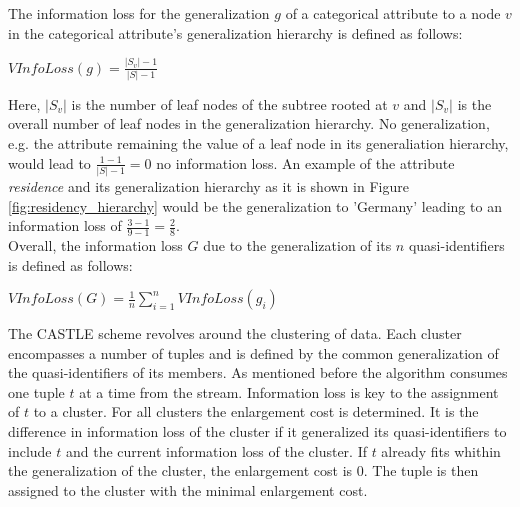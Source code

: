 The information loss for the generalization $g$ of a categorical attribute to a node $v$ in the categorical attribute's generalization hierarchy is defined as follows: 

\begin{center}
    $VInfoLoss(g) = \frac{|S_v| - 1}{|S| - 1}$
\end{center}

Here, $|S_v|$ is the number of leaf nodes of the subtree rooted at $v$ and $|S_v|$ is the overall number of leaf nodes in the generalization hierarchy. No generalization, e.g. the attribute remaining the value of a leaf node in its generaliation hierarchy, would lead to $\frac{1-1}{|S| - 1} = 0$ no information loss. An example of the attribute \textit{residence} and its generalization hierarchy as it is shown in Figure \ref{fig:residency_hierarchy} would be the generalization to 'Germany' leading to an information loss of $\frac{3-1}{9-1} = \frac{2}{8}$. \\
Overall, the information loss $G$ due to the generalization of its $n$ quasi-identifiers is defined as follows: 

\begin{center}
    $VInfoLoss(G) = \frac{1}{n}\sum_{i=1}^{n}VInfoLoss(g_i)$
\end{center}

The CASTLE scheme revolves around the clustering of data. Each cluster encompasses a number of tuples and is defined by the common generalization of the quasi-identifiers of its members. As mentioned before the algorithm consumes one tuple $t$ at a time from the stream. Information loss is key to the assignment of $t$ to a cluster. For all clusters the enlargement cost is determined. It is the difference in information loss of the cluster if it generalized its quasi-identifiers to include $t$ and the current information loss of the cluster. If $t$ already fits whithin the generalization of the cluster, the enlargement cost is $0$. The tuple is then assigned to the cluster with the minimal enlargement cost. 

